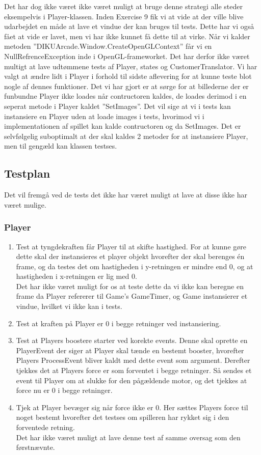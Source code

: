    Det har dog ikke været ikke været muligt at bruge denne strategi alle steder eksempelvis i Player-klassen. Inden Exercise 9 fik vi at vide at der ville blive udarbejdet en måde at lave et vindue der kan bruges til tests. Dette har vi også fået at vide er lavet, men vi har ikke kunnet få dette til at virke. Når vi kalder metoden ''DIKUArcade.Window.CreateOpenGLContext'' får vi en NullRefrenceException inde i OpenGL-frameworket. Det har derfor ikke været multigt at lave udtømmene tests af Player, states og CustomerTranslator. Vi har valgt at ændre lidt i Player i forhold til sidste aflevering for at kunne teste blot nogle af dennes funktioner. Det vi har gjort er at sørge for at billederne der er funbundne Player ikke loades når contructoren kaldes, de loades derimod i en seperat metode i Player kaldet ''SetImages''. Det vil sige at vi i tests kan instansiere en Player uden at loade images i tests, hvorimod vi i implementationen af spillet kan kalde contructoren og da SetImages. Det er selvfølgelig suboptimalt at der skal kaldes 2 metoder for at instansiere Player, men til gengæld kan klassen testses. 
\subsection{Testplan}
   Det vil fremgå ved de tests det ikke har været muligt at lave at disse ikke har været mulige.
   \subsubsection{Player}
      \begin{enumerate}
         \item Test at tyngdekraften får Player til at skifte hastighed. For at kunne gøre dette skal der instansieres et player objekt hvorefter der skal berenges én frame, og da testes det om hastigheden i y-retningen er mindre end 0, og at hastigheden i x-retningen er lig med 0.\\
         Det har ikke været muligt for os at teste dette da vi ikke kan beregne en frame da Player refererer til Game's GameTimer, og Game instansierer et vindue, hvilket vi ikke kan i tests.
         \item Test at kraften på Player er 0 i begge retninger ved instansiering. 
         \item Test at Players boostere starter ved korekte events. Denne skal oprette en PlayerEvent der siger at Player skal tænde en bestemt booster, hvorefter Players ProcessEvent bliver kaldt med dette event som argument. Derefter tjekkes det at Players force er som forventet i begge retninger. Så sendes et event til Player om at slukke for den pågældende motor, og det tjekkes at force nu er 0 i begge retninger.
         \item Tjek at Player bevæger sig når force ikke er 0. Her sættes Players force til noget bestemt hvorefter det testses om spilleren har rykket sig i den forventede retning. \\
         Det har ikke været muligt at lave denne test af samme oversag som den førstnævnte.       
      \end{enumerate}
